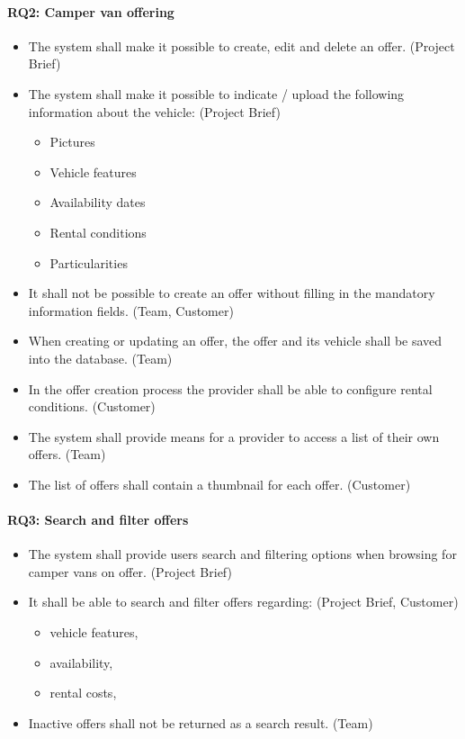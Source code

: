 \paragraph{RQ2: Camper van offering}
\begin{itemize}
    \item The system shall make it possible to create, edit and delete an offer. (Project Brief)
    \item The system shall make it possible to indicate / upload the following information about the vehicle: (Project Brief)
        \begin{itemize}
            \item Pictures
            \item Vehicle features
            \item Availability dates
            \item Rental conditions
            \item Particularities
        \end{itemize}
    \item It shall not be possible to create an offer without filling in the mandatory information fields. (Team, Customer)
    \item When creating or updating an offer, the offer and its vehicle shall be saved into the database. (Team)
    \item In the offer creation process the provider shall be able to configure rental conditions. (Customer)
    \item The system shall provide means for a provider to access a list of their own offers. (Team)
    \item The list of offers shall contain a thumbnail for each offer. (Customer)
\end{itemize}

\paragraph{RQ3: Search and filter offers}
\begin{itemize}
    \item The system shall provide users search and filtering options when browsing for camper vans on offer. (Project Brief)
    \item It shall be able to search and filter offers regarding: (Project Brief, Customer)
        \begin{itemize}
            \item vehicle features,
            \item availability,
            \item rental costs,
        \end{itemize}
    \item Inactive offers shall not be returned as a search result. (Team)
\end{itemize}

